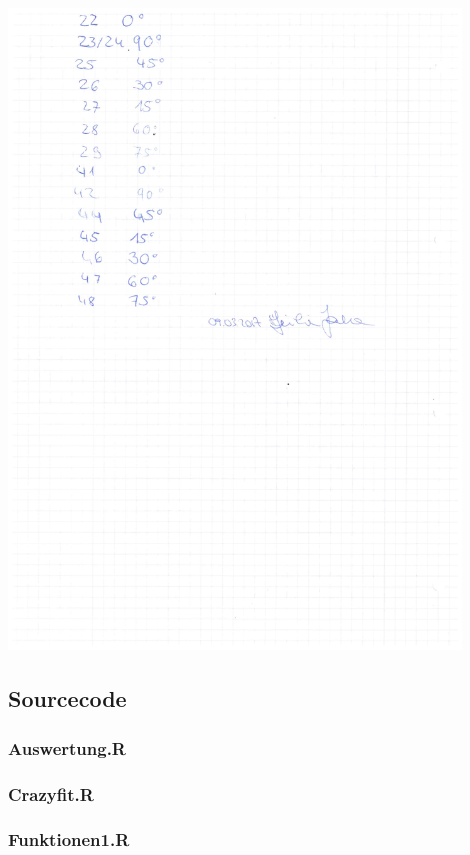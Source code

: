 \begin{minipage}{\textwidth}
	\centering
	\includegraphics[width=0.9\textwidth]{../figures/Laborbuch2Holo.pdf}
\end{minipage}

\subsection{Sourcecode}
\label{code}
\subsubsection*{Auswertung.R}

\subsubsection*{Crazyfit.R}

\subsubsection*{Funktionen1.R}

